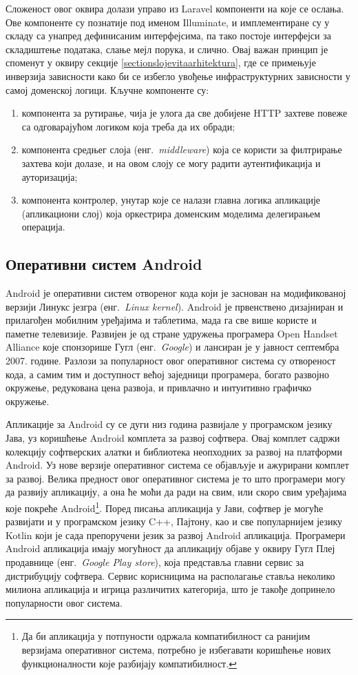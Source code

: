 \documentclass[12pt,oneside]{memoir}
\begin{document}
Сложеност овог оквира долази управо из Laravel компоненти на које се ослања. Ове компоненте су познатије под именом Illuminate, и имплементиране су у складу са унапред дефинисаним интерфејсима, па тако постоје интерфејси за складиштење података, слање мејл порука, и слично. Овај важан принцип је споменут у оквиру секције \ref{sectionslojevitaarhitektura}, где се примењује инверзија зависности како би се избегло увођење инфраструктурних зависности у самој доменској логици. Кључне компоненте су:
\begin{enumerate}
\item компонента за рутирање, чија је улога да све добијене HTTP захтеве повеже са одговарајућом логиком која треба да их обради;
\item компонента средњег слоја (енг.~\textit{middleware}) која се користи за филтрирање захтева који долазе, и на овом слоју се могу радити аутентификација и ауторизација;
\item компонента контролер, унутар које се налази главна логика апликације (апликациони слој) која оркестрира доменским моделима делегирањем операција.
\end{enumerate}

\subsection{Оперативни систем Android}
Android \cite{Android} је оперативни систем отвореног кода који је заснован на модификованој верзији Линукс језгра (енг.~\textit{Linux kernel}). Android је првенствено дизајниран и прилагођен мобилним уређајима и таблетима, мада га све више користе и паметне телевизије. Развијен је од стране удружења програмера Open Handset Alliance које спонзорише Гугл (енг.~\textit{Google}) и лансиран је у јавност септембра 2007. године. Разлози за популарност овог оперативног система су отвореност кода, а самим тим и доступност већој заједници програмера, богато развојно окружење, редукована цена развоја, и привлачно и интуитивно графичко окружење.

Апликације за Android су се дуги низ година развијале у програмском језику Јава, уз коришћење Android комплета за развој софтвера. Овај комплет садржи колекцију софтверских алатки и библиотека неопходних за развој на платформи Android. Уз нове верзије оперативног система се објављује и ажурирани комплет за развој. Велика предност овог оперативног система је то што програмери могу да развију апликацију, а она ће моћи да ради на свим, или скоро свим уређајима које покреће Android\footnote{Да би апликација у потпуности одржала компатибилност са ранијим верзијама оперативног система, потребно је избегавати коришћење нових функционалности које разбијају компатибилност.}. Поред писања апликација у Јави, софтвер је могуће развијати и у програмском језику C++, Пајтону, као и све популарнијем језику Kotlin који је сада препоручени језик за развој Android апликација. Програмери Android апликација имају могућност да апликацију објаве у оквиру Гугл Плеј продавнице (енг.~\textit{Google Play store}), која представља главни сервис за дистрибуцију софтвера. Сервис корисницима на располагање ставља неколико милиона апликација и игрица различитих категорија, што је такође допринело популарности овог система.
\end{document}
